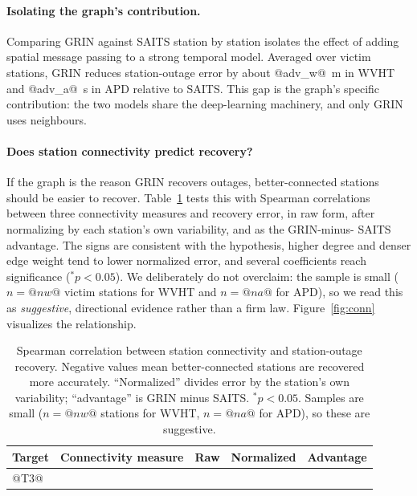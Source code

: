 \documentclass[11pt]{article}
\begin{document}
\begin{table}[t]
\centering
\caption{Imputation MAE for \textbf{APD} (s) across missingness rates, MCAR and
Block at 5/10/20/30/50\%. GRIN is the basin-aware graph (mean over three model
seeds). Lower is better; best per column in bold.}
\label{tab:sweepA}
\small
{}
\end{table}

\paragraph{Isolating the graph's contribution.}
Comparing GRIN against SAITS station by station isolates the effect of adding
spatial message passing to a strong temporal model. Averaged over victim
stations, GRIN reduces station-outage error by about @adv_w@~m in WVHT and
@adv_a@~s in APD relative to SAITS. This gap is the graph's specific
contribution: the two models share the deep-learning machinery, and only GRIN
uses neighbours.

\paragraph{Does station connectivity predict recovery?}
If the graph is the reason GRIN recovers outages, better-connected stations
should be easier to recover. Table~\ref{tab:conn} tests this with Spearman
correlations between three connectivity measures and recovery error, in raw
form, after normalizing by each station's own variability, and as the GRIN-minus-
SAITS advantage. The signs are consistent with the hypothesis, higher degree
and denser edge weight tend to lower normalized error, and several coefficients
reach significance ($^{*}p<0.05$). We deliberately do not overclaim: the sample
is small ($n=@nw@$ victim stations for WVHT and $n=@na@$ for APD), so we read this
as \emph{suggestive}, directional evidence rather than a firm law.
Figure~\ref{fig:conn} visualizes the relationship.

\begin{table}[t]
\centering
\caption{Spearman correlation between station connectivity and station-outage
recovery. Negative values mean better-connected stations are recovered more
accurately. ``Normalized'' divides error by the station's own variability;
``advantage'' is GRIN minus SAITS. $^{*}p<0.05$. Samples are small
($n=@nw@$ stations for WVHT, $n=@na@$ for APD), so these are suggestive.}
\label{tab:conn}
\small
\begin{tabular}{l l ccc}
\toprule
Target & Connectivity measure & Raw & Normalized & Advantage\\
\midrule
@T3@
\bottomrule
\end{tabular}
\end{table}
\end{document}
